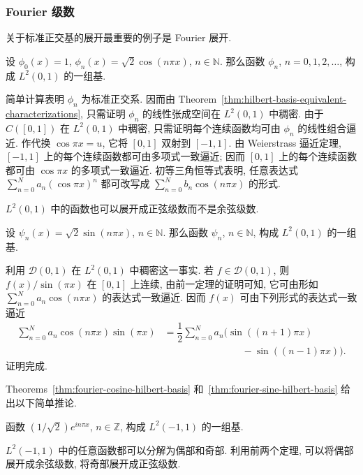 \subsubsection{Fourier 级数}\label{subsec:fourier-series-hilbert-bases}

关于标准正交基的展开最重要的例子是 Fourier 展开.

\begin{Theorem}
\label{thm:fourier-cosine-hilbert-basis}
设 $\phi_0(x)=1$, $\phi_n(x)=\sqrt2\cos(n\pi x)$, $n\in\mathbb{N}$. 那么函数 $\phi_n$, $n=0,1,2,\ldots$, 构成 $L^2(0,1)$ 的一组基.
\end{Theorem}

\begin{Proof}
简单计算表明 $\phi_n$ 为标准正交系. 因而由 Theorem~\ref{thm:hilbert-basis-equivalent-characterizations}, 只需证明 $\phi_n$ 的线性张成空间在 $L^2(0,1)$ 中稠密. 由于 $C([0,1])$ 在 $L^2(0,1)$ 中稠密, 只需证明每个连续函数均可由 $\phi_n$ 的线性组合逼近. 作代换 $\cos\pi x=u$, 它将 $[0,1]$ 双射到 $[-1,1]$. 由 Weierstrass 逼近定理, $[-1,1]$ 上的每个连续函数都可由多项式一致逼近; 因而 $[0,1]$ 上的每个连续函数都可由 $\cos\pi x$ 的多项式一致逼近. 初等三角恒等式表明, 任意表达式 $\sum_{n=0}^N a_n(\cos\pi x)^n$ 都可改写成 $\sum_{n=0}^N b_n\cos(n\pi x)$ 的形式.
\end{Proof}

$L^2(0,1)$ 中的函数也可以展开成正弦级数而不是余弦级数.

\begin{Theorem}
\label{thm:fourier-sine-hilbert-basis}
设 $\psi_n(x)=\sqrt2\sin(n\pi x)$, $n\in\mathbb{N}$. 那么函数 $\psi_n$, $n\in\mathbb{N}$, 构成 $L^2(0,1)$ 的一组基.
\end{Theorem}

\begin{Proof}
利用 $\mathcal{D}(0,1)$ 在 $L^2(0,1)$ 中稠密这一事实. 若 $f\in\mathcal{D}(0,1)$, 则 $f(x)/\sin(\pi x)$ 在 $[0,1]$ 上连续, 由前一定理的证明可知, 它可由形如 $\sum_{n=0}^N a_n\cos(n\pi x)$ 的表达式一致逼近. 因而 $f(x)$ 可由下列形式的表达式一致逼近
\begin{equation}\label{eq:fourier-sine-cosine-product-identity}
\begin{aligned}
\sum_{n=0}^N a_n\cos(n\pi x)\sin(\pi x)
&=\dfrac12\sum_{n=0}^N a_n\bigl(\sin((n+1)\pi x)\\
&\hspace{8em}-\sin((n-1)\pi x)\bigr).
\end{aligned}
\end{equation}
证明完成.
\end{Proof}

Theorems~\ref{thm:fourier-cosine-hilbert-basis} 和~\ref{thm:fourier-sine-hilbert-basis} 给出以下简单推论.

\begin{Corollary}
\label{cor:fourier-complex-hilbert-basis}
函数 $(1/\sqrt2)e^{in\pi x}$, $n\in\mathbb{Z}$, 构成 $L^2(-1,1)$ 的一组基.
\end{Corollary}

\begin{Proof}
$L^2(-1,1)$ 中的任意函数都可以分解为偶部和奇部. 利用前两个定理, 可以将偶部展开成余弦级数, 将奇部展开成正弦级数.
\end{Proof}
